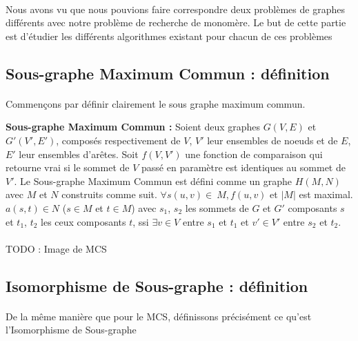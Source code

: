 \documentclass[12pt,french,twoside]{report}
\begin{document}
\paragraph{}Nous avons vu que nous pouvions faire correspondre deux problèmes de graphes différents avec notre problème
de recherche de monomère. Le but de cette partie est d'étudier les différents algorithmes existant pour chacun de ces
problèmes

\subsection{Sous-graphe Maximum Commun : définition}

\paragraph{}Commençons par définir clairement le sous graphe maximum commun.

\begin{definition}\textbf{Sous-graphe Maximum Commun :}
  Soient deux graphes $G(V, E)$ et $G'(V', E')$, composés respectivement de $V$, $V'$ leur ensembles de noeuds et de $E$, $E'$
  leur ensembles d'arêtes. Soit $f(V, V')$ une fonction de comparaison qui retourne vrai si le sommet de $V$ passé en paramètre
  est identiques au sommet
  de $V'$. Le Sous-graphe Maximum Commun est défini comme un graphe $H(M, N)$ avec $M$ et $N$ construits comme suit. $\forall
  s(u,v)\in~M, f(u, v)$ et $|M|$ est  maximal. $a(s, t) \in N$ ($s \in M$ et $t \in M$) avec $s_1$, $s_2$ les sommets de
  $G$ et $G'$ composants $s$ et $t_1$, $t_2$ les ceux composants $t$, ssi $\exists v \in V$ entre $s_1$ et $t_1$ et $v' \in
  V'$ entre $s_2$ et $t_2$.
\end{definition}

\paragraph{}TODO : Image de MCS



\subsection{Isomorphisme de Sous-graphe : définition}

\paragraph{}De la même manière que pour le MCS, définissons précisément ce qu'est l'Isomorphisme de Sous-graphe
\end{document}
